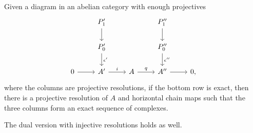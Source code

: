 \begin{lem}
    Given a diagram in an abelian category with enough projectives
    \[\begin{tikzcd}
        & P_1'\ar[d] && P_1''\ar[d]& \\
        & P_0'\ar[d,"\epsilon'"] && P_0''\ar[d,"\epsilon ''"]& \\
       0\arrow[r] & A'\arrow[r,"i"] & A\arrow[r,"q"] & A'' \arrow[r] &0,
    \end{tikzcd}\]
    where the columns are projective resolutions, if the bottom row is exact, then there is a projective resolution of $A$ and horizontal chain maps such that the three columns form an exact sequence of complexes.
    
    The dual version with injective resolutions holds as well.
\end{lem}
